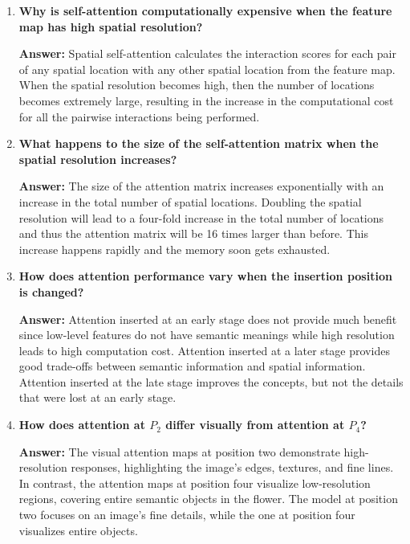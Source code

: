\documentclass[10pt]{article}
\begin{document}
\begin{enumerate}
\vspace{5mm}

\item \textbf{Why is self-attention computationally expensive when the feature map
has high spatial resolution?}

\textbf{Answer:} Spatial self-attention calculates the interaction scores for each pair of any spatial location with any other spatial location from the feature map. When the spatial resolution becomes high, then the number of locations becomes extremely large, resulting in the increase in the computational cost for all the pairwise interactions being performed.

\vspace{5mm}

\item \textbf{What happens to the size of the self-attention matrix when the spatial
resolution increases?}

\textbf{Answer:} The size of the attention matrix increases exponentially with an increase in the total number of spatial locations. Doubling the spatial resolution will lead to a four-fold increase in the total number of locations and thus the attention matrix will be 16 times larger than before. This increase happens rapidly and the memory soon gets exhausted.

\vspace{5mm}

\item \textbf{How does attention performance vary when the insertion position is
changed?}

\textbf{Answer:} Attention inserted at an early stage does not provide much benefit since low-level features do not have semantic meanings while high resolution leads to high computation cost. Attention inserted at a later stage provides good trade-offs between semantic information and spatial information. Attention inserted at the late stage improves the concepts, but not the details that were lost at an early stage.

\vspace{5mm}

\item \textbf{How does attention at $P_2$ differ visually from attention at $P_4$?}

\textbf{Answer:} The visual attention maps at position two demonstrate high-resolution responses, highlighting the image’s edges, textures, and fine lines. In contrast, the attention maps at position four visualize low-resolution regions, covering entire semantic objects in the flower. The model at position two focuses on an image’s fine details, while the one at position four visualizes entire objects.


\end{enumerate}
\end{document}
